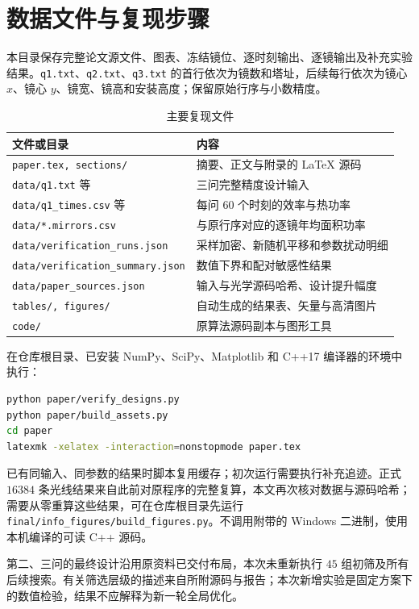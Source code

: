 \clearpage
\section{数据文件与复现步骤}
本目录保存完整论文源文件、图表、冻结镜位、逐时刻输出、逐镜输出及补充实验结果。\texttt{q1.txt}、\texttt{q2.txt}、\texttt{q3.txt} 的首行依次为镜数和塔址，后续每行依次为镜心 $x$、镜心 $y$、镜宽、镜高和安装高度；保留原始行序与小数精度。
\begin{table}[H]\centering\small
\caption{主要复现文件}
\begin{tabular}{p{68mm}p{78mm}}\toprule
文件或目录 & 内容\\\midrule
\texttt{paper.tex, sections/} & 摘要、正文与附录的 LaTeX 源码\\
\texttt{data/q1.txt} 等 & 三问完整精度设计输入\\
\texttt{data/q1\_times.csv} 等 & 每问 $60$ 个时刻的效率与热功率\\
\texttt{data/*.mirrors.csv} & 与原行序对应的逐镜年均面积功率\\
\texttt{data/verification\_runs.json} & 采样加密、新随机平移和参数扰动明细\\
\texttt{data/verification\_summary.json} & 数值下界和配对敏感性结果\\
\texttt{data/paper\_sources.json} & 输入与光学源码哈希、设计提升幅度\\
\texttt{tables/, figures/} & 自动生成的结果表、矢量与高清图片\\
\texttt{code/} & 原算法源码副本与图形工具\\
\bottomrule\end{tabular}\end{table}
在仓库根目录、已安装 NumPy、SciPy、Matplotlib 和 C++17 编译器的环境中执行：
\begin{lstlisting}[language=bash]
python paper/verify_designs.py
python paper/build_assets.py
cd paper
latexmk -xelatex -interaction=nonstopmode paper.tex
\end{lstlisting}
已有同输入、同参数的结果时脚本复用缓存；初次运行需要执行补充追迹。正式 $16384$ 条光线结果来自此前对原程序的完整复算，本文再次核对数据与源码哈希；需要从零重算这些结果，可在仓库根目录先运行 \texttt{final/info\_figures/build\_figures.py}。不调用附带的 Windows 二进制，使用本机编译的可读 C++ 源码。

第二、三问的最终设计沿用原资料已交付布局，本次未重新执行 $45$ 组初筛及所有后续搜索。有关筛选层级的描述来自所附源码与报告；本次新增实验是固定方案下的数值检验，结果不应解释为新一轮全局优化。

